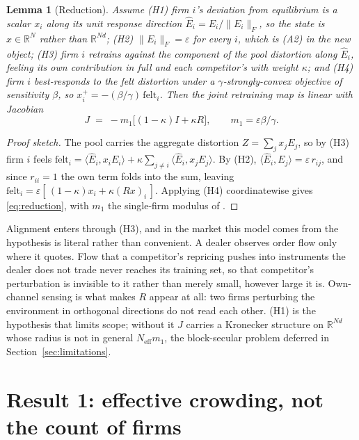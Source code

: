 \documentclass{article}
\theoremstyle{plain}
\newtheorem{lemma}[theorem]{Lemma}
\theoremstyle{definition}
\newcommand{\Neff}{N_{\mathrm{eff}}}
\begin{document}
\begin{lemma}[Reduction]
\label{lem:reduction}
Assume \textup{(H1)} firm $i$'s deviation from equilibrium is a scalar $x_i$ along its unit response direction $\hat{E}_i = E_i/\|E_i\|_F$, so the state is $x \in \mathbb{R}^N$ rather than $\mathbb{R}^{Nd}$; \textup{(H2)} $\|E_i\|_F = \varepsilon$ for every $i$, which is \textup{(A2)} in the new object; \textup{(H3)} firm $i$ retrains against the component of the pool distortion along $\hat{E}_i$, feeling its own contribution in full and each competitor's with weight $\kappa$; and \textup{(H4)} firm $i$ best-responds to the felt distortion under a $\gamma$-strongly-convex objective of sensitivity $\beta$, so $x_i^{+} = -(\beta/\gamma)\,\mathrm{felt}_i$. Then the joint retraining map is linear with Jacobian
\begin{equation}
\label{eq:reduction}
J \;=\; -m_1\bigl[(1-\kappa)I + \kappa R\bigr], \qquad m_1 = \varepsilon\beta/\gamma .
\end{equation}
\end{lemma}

\begin{proof}[Proof sketch]
The pool carries the aggregate distortion $Z = \sum_j x_j E_j$, so by (H3) firm $i$ feels $\mathrm{felt}_i = \langle \hat{E}_i, x_i E_i\rangle + \kappa\sum_{j\neq i}\langle \hat{E}_i, x_j E_j\rangle$. By (H2), $\langle \hat{E}_i, E_j\rangle = \varepsilon\, r_{ij}$, and since $r_{ii}=1$ the own term folds into the sum, leaving $\mathrm{felt}_i = \varepsilon[\,(1-\kappa)x_i + \kappa (Rx)_i\,]$. Applying (H4) coordinatewise gives \eqref{eq:reduction}, with $m_1$ the single-firm modulus of \citet{perdomo2020}.
\end{proof}

Alignment enters through (H3), and in the market this model comes from the hypothesis is literal rather than convenient. A dealer observes order flow only where it quotes. Flow that a competitor's repricing pushes into instruments the dealer does not trade never reaches its training set, so that competitor's perturbation is invisible to it rather than merely small, however large it is. Own-channel sensing is what makes $R$ appear at all: two firms perturbing the environment in orthogonal directions do not read each other. (H1) is the hypothesis that limits scope; without it $J$ carries a Kronecker structure on $\mathbb{R}^{Nd}$ whose radius is not in general $\Neff m_1$, the block-secular problem deferred in Section~\ref{sec:limitations}.

\section{Result 1: effective crowding, not the count of firms}
\label{sec:alignment}
\end{document}
